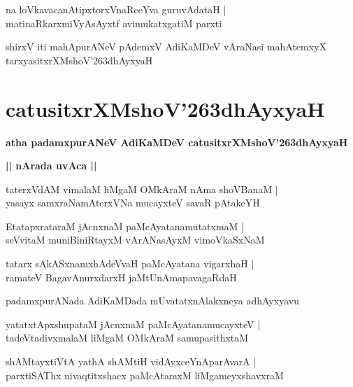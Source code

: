 \documentclass[twoside,12pt,openright]{book}
\def\S{\char'263}
\newcounter{shloka}[chapter]
\def\uvaca#1{\centerline{{\large\textbf{#1}}}}
\begin{document}
\begin{shloka}
na loVkavacanAtipxtorxVnaRceYva guruvAdataH |\\
matinaRkarxmiVyAsAyxtf avimukatxgatiM parxti 
\end{shloka}

\begin{center}
shirxV iti mahApurANeV pAdemxV AdiKaMDeV vAraNasi mahAtemxyX tarxyasitxrXMshoV\S dhAyxyaH
\end{center}

\chapter{catusitxrXMshoV\S dhAyxyaH}

\begin{center}
{\LARGE\bfseries atha padamxpurANeV AdiKaMDeV catusitxrXMshoV\S dhAyxyaH}
\end{center}

\uvaca{ || nArada uvAca || }

\begin{shloka}
taterxVdAM vimalaM liMgaM OMkAraM nAma shoVBanaM |\\
yasayx samxraNamAterxVNa mucayxteV savaR pAtakeYH 
\end{shloka}

\begin{shloka}
EtatapxrataraM jAcnxnaM paMcAyatanamutatxmaM |\\
seVvitaM muniBiniRtayxM vArANasAyxM vimoVkaSxNaM 
\end{shloka}

\begin{shloka}
tatarx sAkASxnamxhAdeVvaH paMcAyatana vigarxhaH |\\
ramateV BagavAnurxdarxH jaMtUnAmapavagaRdaH 
\end{shloka}
\begin{center}
padamxpurANada AdiKaMDada mUvatatxnAlakxneya adhAyxyavu 
\end{center}

\begin{shloka}
yatatxtApxshupataM jAcnxnaM paMcAyatanamucayxteV |\\
tadeVtadivxmalaM liMgaM OMkAraM samupasithxtaM 
\end{shloka}

\begin{shloka}
shAMtayxtiVtA yathA shAMtiH vidAyxceYnAparAvarA |\\
parxtiSAThx nivaqtitxshacx paMcAtamxM liMgameyxshavxraM 
\end{shloka}
\end{document}
